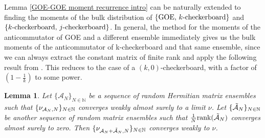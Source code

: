 \documentclass[11pt,reqno]{amsart}
\numberwithin{equation}{section}
\theoremstyle{plain}
\newtheorem{lemma}[thm]{Lemma}
\newtheorem{theorem}[thm]{Theorem}
\newcommand{\NC}{\textnormal{NC}}
\begin{document}
Lemma \ref{GOE-GOE moment recurrence intro} can be naturally extended to finding the moments of the bulk distribution of $\{\textup{GOE, }\\k\textup{-checkerboard}\}$ and $\{k\textup{-checkerboard, }j\textup{-checkerboard}\}$. In general, the method for the moments of the anticommutator of GOE and a different ensemble immediately gives us the bulk moments of the anticommutator of k-checkerboard and that same ensemble, since we can always extract the constant matrix of finite rank and apply the following result from \cite{Tao1}. This reduces to the case of a $(k,0)$-checkerboard, with a factor of $\left(1-\frac{1}{k}\right)$ to some power.

\begin{lemma}{\cite{Tao1}}
Let $\{\mathcal{A}_N\}_{N\in\mathbb{N}}$ be a sequence of random Hermitian matrix ensembles such that $\\ \{\nu_{\mathcal{A}_N,N}\}_{N\in\mathbb{N}}$ converges weakly almost surely to a limit $\nu$. Let $\{\Tilde{\mathcal{A}}_N\}_{N\in\mathbb{N}}$ be another sequence of random matrix ensembles such that $\frac{1}{N}\text{rank}(\Tilde{\mathcal{A}}_N)$ converges almost surely to zero. Then $\{\nu_{\mathcal{A}_N+\Tilde{\mathcal{A}}_N,N}\}_{N\in\mathbb{N}}$ converges weakly to $\nu$.
\end{lemma}




\end{document}

